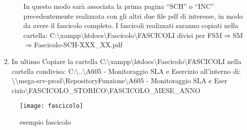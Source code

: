 \documentclass[
10pt, %
a4paper, %
oneside, %
headinclude,footinclude, %
BCOR5mm, %
]{scrartcl}
\begin{document}
\begin{enumerate}
\begin{itemize}
\begin{itemize}
\begin{itemize}
\end{itemize}
\end{itemize}
In questo modo sarà associata la prima pagina “SCH” o “INC” precedentemente realizzata con gli altri due file pdf di interesse,  in modo da avere il fascicolo completo.
I fascicoli realizzati saranno copiati nella cartella: C:$\setminus$xampp$\setminus$htdocs$\setminus$Fascicolo$\setminus$FASCICOLI divisi per FSM$\Rightarrow$SM$\Rightarrow$Fascicolo-SCH-XXX\_XX.pdf
\end{itemize}
\item In ultimo Copiare la cartella C:$\setminus$xampp$\setminus$htdocs$\setminus$Fascicolo$\setminus$FASCICOLI nella cartella condivisa:
C:$\setminus$..$\setminus$A605 - Monitoraggio SLA e Esercizio all'interno di:\\
$\setminus$$\setminus$mega-srv-prod$\setminus$RepositoryFunzione$\setminus$A605 - Monitoraggio SLA e Eser\\cizio$\setminus$FASCICOLO\_STORICO$\setminus$FASCICOLO\_MESE\_ANNO


\end{enumerate}

\begin{figure}[h]
\centering\texttt{[image: fascicolo]}
\caption{esempio fascicolo}
\end{figure}


%


\end{document}
